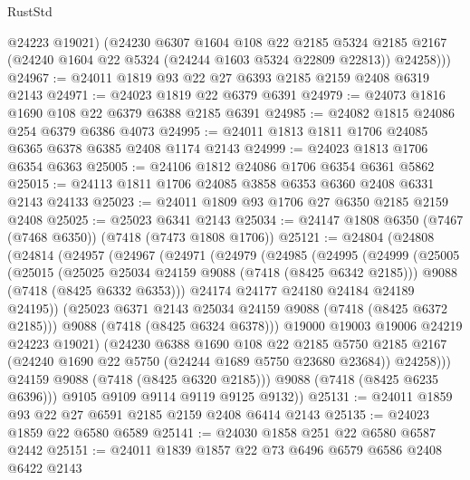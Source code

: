 \begin{lexlean}{RustStd}
\begin{coremodule}
          @24223
          @19021)
        (@24230
          @6307
          @1604
          @108
          @22
          @2185
          @5324
          @2185
          @2167
          (@24240 @1604 @22 @5324 (@24244 @1603 @5324 @22809 @22813))
          @24258)))
@24967 := @24011 @1819 @93 @22 @27 @6393 @2185 @2159 @2408 @6319 @2143
@24971 := @24023 @1819 @22 @6379 @6391
@24979 := @24073 @1816 @1690 @108 @22 @6379 @6388 @2185 @6391
@24985 := @24082 @1815 @24086 @254 @6379 @6386 @4073
@24995 := @24011 @1813 @1811 @1706 @24085 @6365 @6378 @6385 @2408 @1174 @2143
@24999 := @24023 @1813 @1706 @6354 @6363
@25005 := @24106 @1812 @24086 @1706 @6354 @6361 @5862
@25015 := @24113 @1811 @1706 @24085 @3858 @6353 @6360 @2408 @6331 @2143 @24133
@25023 := @24011 @1809 @93 @1706 @27 @6350 @2185 @2159 @2408
@25025 := @25023 @6341 @2143
@25034 := @24147 @1808 @6350 (@7467 (@7468 @6350)) (@7418 (@7473 @1808 @1706))
@25121 := @24804
    (@24808
      (@24814
        (@24957
          (@24967
            (@24971
              (@24979
                (@24985
                  (@24995
                    (@24999
                      (@25005
                        (@25015
                          (@25025 @25034 @24159 @9088 (@7418 (@8425 @6342 @2185)))
                          @9088
                          (@7418 (@8425 @6332 @6353)))
                        @24174
                        @24177
                        @24180
                        @24184
                        @24189
                        @24195))
                    (@25023 @6371 @2143 @25034 @24159 @9088 (@7418 (@8425 @6372 @2185)))
                    @9088
                    (@7418 (@8425 @6324 @6378)))
                  @19000
                  @19003
                  @19006
                  @24219
                  @24223
                  @19021)
                (@24230
                  @6388
                  @1690
                  @108
                  @22
                  @2185
                  @5750
                  @2185
                  @2167
                  (@24240 @1690 @22 @5750 (@24244 @1689 @5750 @23680 @23684))
                  @24258)))
            @24159
            @9088
            (@7418 (@8425 @6320 @2185)))
          @9088
          (@7418 (@8425 @6235 @6396)))
        @9105
        @9109
        @9114
        @9119
        @9125
        @9132))
@25131 := @24011 @1859 @93 @22 @27 @6591 @2185 @2159 @2408 @6414 @2143
@25135 := @24023 @1859 @22 @6580 @6589
@25141 := @24030 @1858 @251 @22 @6580 @6587 @2442
@25151 := @24011 @1839 @1857 @22 @73 @6496 @6579 @6586 @2408 @6422 @2143

\end{coremodule}
\end{lexlean}
